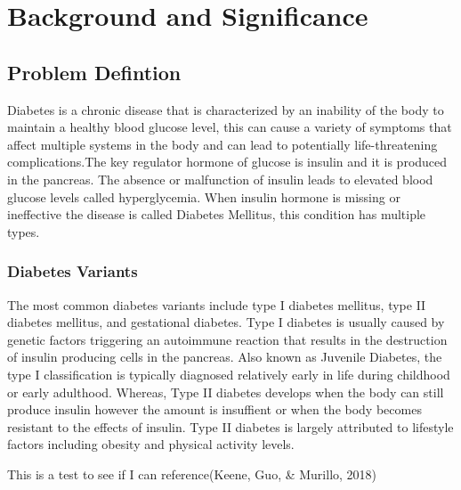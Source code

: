 \documentclass [11pt, proquest] {uwthesis}[2015/03/03]
\begin{document}
\titlepage
  \pagebreak


\copyrightpage

\setcounter{page}{-1}

\tableofcontents
\listoffigures
\listoftables



\textpages


\chapter{Background and Significance}\label{rmd-basics}

\section{Problem Defintion}\label{problem-defintion}

Diabetes is a chronic disease that is characterized by an inability of
the body to maintain a healthy blood glucose level, this can cause a
variety of symptoms that affect multiple systems in the body and can
lead to potentially life-threatening complications.The key regulator
hormone of glucose is insulin and it is produced in the pancreas. The
absence or malfunction of insulin leads to elevated blood glucose levels
called hyperglycemia. When insulin hormone is missing or ineffective the
disease is called Diabetes Mellitus, this condition has multiple types.

\subsection{Diabetes Variants}\label{diabetes-variants}

The most common diabetes variants include type I diabetes mellitus, type
II diabetes mellitus, and gestational diabetes. Type I diabetes is
usually caused by genetic factors triggering an autoimmune reaction that
results in the destruction of insulin producing cells in the pancreas.
Also known as Juvenile Diabetes, the type I classification is typically
diagnosed relatively early in life during childhood or early adulthood.
Whereas, Type II diabetes develops when the body can still produce
insulin however the amount is insuffient or when the body becomes
resistant to the effects of insulin. Type II diabetes is largely
attributed to lifestyle factors including obesity and physical activity
levels.

This is a test to see if I can reference(Keene, Guo, \& Murillo, 2018)
\end{document}
